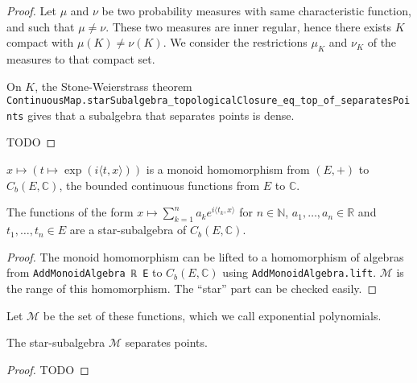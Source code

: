 \begin{proof}
Let $\mu$ and $\nu$ be two probability measures with same characteristic function, and such that $\mu \ne \nu$.
These two measures are inner regular, hence there exists $K$ compact with $\mu(K) \ne \nu(K)$.
We consider the restrictions $\mu_K$ and $\nu_K$ of the measures to that compact set.

On $K$, the Stone-Weierstrass theorem \texttt{ContinuousMap.starSubalgebra\_topologicalClosure\_eq\_top\_of\_separatesPoints} gives that a subalgebra that separates points is dense.

TODO
\end{proof}

\begin{lemma}\label{lem:exp_character}
$x \mapsto (t \mapsto \exp(i \langle t, x \rangle))$ is a monoid homomorphism from $(E,+)$ to $C_b(E, \mathbb{C})$, the bounded continuous functions from $E$ to $\mathbb{C}$.
\end{lemma}

\begin{lemma}\label{lem:starSubalgebra_expPoly}
The functions of the form $x \mapsto \sum_{k=1}^n a_k e^{i\langle t_k, x\rangle}$ for $n \in \mathbb{N}$, $a_1, \ldots, a_n \in \mathbb{R}$ and $t_1, \ldots, t_n \in E$ are a star-subalgebra of $C_b(E, \mathbb{C})$. 
\end{lemma}

\begin{proof}
The monoid homomorphism can be lifted to a homomorphism of algebras from \texttt{AddMonoidAlgebra ℝ E} to $C_b(E, \mathbb{C})$ using \texttt{AddMonoidAlgebra.lift}. $\mathcal M$ is the range of this homomorphism. The ``star'' part can be checked easily.
\end{proof}

Let $\mathcal M$ be the set of these functions, which we call exponential polynomials.

\begin{lemma}\label{lem:separating_expPoly}
The star-subalgebra $\mathcal M$ separates points.
\end{lemma}

\begin{proof}
TODO
\end{proof}


